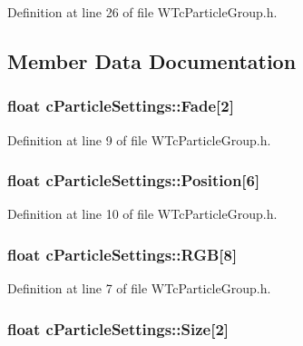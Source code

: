 Definition at line 26 of file WTcParticleGroup.h.



\subsection{Member Data Documentation}
\hypertarget{classc_particle_settings_a82cdd319afba5bb182ff3d15b9137232}{
\subsubsection[{Fade}]{\setlength{\rightskip}{0pt plus 5cm}float {\bf cParticleSettings::Fade}\mbox{[}2\mbox{]}}}
\label{classc_particle_settings_a82cdd319afba5bb182ff3d15b9137232}


Definition at line 9 of file WTcParticleGroup.h.

\hypertarget{classc_particle_settings_ac04a5e0b7d79825cf6221389a4829133}{
\subsubsection[{Position}]{\setlength{\rightskip}{0pt plus 5cm}float {\bf cParticleSettings::Position}\mbox{[}6\mbox{]}}}
\label{classc_particle_settings_ac04a5e0b7d79825cf6221389a4829133}


Definition at line 10 of file WTcParticleGroup.h.

\hypertarget{classc_particle_settings_af8e7761264c98c5f874b6be87ffd2c57}{
\subsubsection[{RGB}]{\setlength{\rightskip}{0pt plus 5cm}float {\bf cParticleSettings::RGB}\mbox{[}8\mbox{]}}}
\label{classc_particle_settings_af8e7761264c98c5f874b6be87ffd2c57}


Definition at line 7 of file WTcParticleGroup.h.

\hypertarget{classc_particle_settings_a46ca8d9e95f99693d7202d223c16918e}{
\subsubsection[{Size}]{\setlength{\rightskip}{0pt plus 5cm}float {\bf cParticleSettings::Size}\mbox{[}2\mbox{]}}}
\label{classc_particle_settings_a46ca8d9e95f99693d7202d223c16918e}



